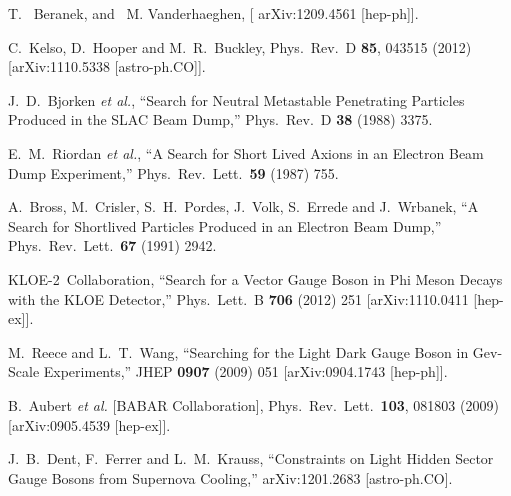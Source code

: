 T. ~Beranek, and ~M. Vanderhaeghen, [	arXiv:1209.4561 [hep-ph]].

  C.~Kelso, D.~Hooper and M.~R.~Buckley,
  Phys.\ Rev.\ D {\bf 85}, 043515 (2012)
  [arXiv:1110.5338 [astro-ph.CO]].



J.~D.~Bjorken {\it et al.},
``Search for Neutral Metastable Penetrating Particles Produced in the SLAC Beam Dump,''
Phys.\ Rev.\ D {\bf 38} (1988) 3375.

E.~M.~Riordan {\it et al.},
``A Search for Short Lived Axions in an Electron Beam Dump Experiment,''
Phys.\ Rev.\ Lett.\ {\bf 59} (1987) 755.

A.~Bross, M.~Crisler, S.~H.~Pordes, J.~Volk, S.~Errede and J.~Wrbanek,
``A Search for Shortlived Particles Produced in an Electron Beam Dump,''
Phys.\ Rev.\ Lett.\ {\bf 67} (1991) 2942.

KLOE-2~Collaboration,
``Search for a Vector Gauge Boson in Phi Meson Decays with the KLOE Detector,''
Phys.\ Lett.\ B {\bf 706} (2012) 251
[arXiv:1110.0411 [hep-ex]].

M.~Reece and L.~T.~Wang,
``Searching for the Light Dark Gauge Boson in Gev-Scale Experiments,''
JHEP {\bf 0907} (2009) 051
[arXiv:0904.1743 [hep-ph]].

  B.~Aubert {\it et al.}  [BABAR Collaboration], Phys.\ Rev.\ Lett.\  {\bf 103}, 081803 (2009) [arXiv:0905.4539 [hep-ex]].

J.~B.~Dent, F.~Ferrer and L.~M.~Krauss,
``Constraints on Light Hidden Sector Gauge Bosons from Supernova Cooling,''
arXiv:1201.2683 [astro-ph.CO].
